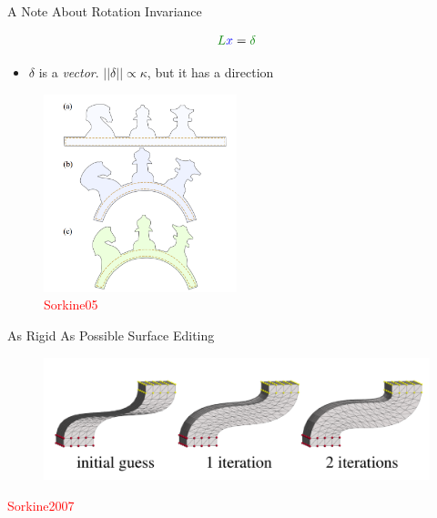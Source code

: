\documentclass{beamer}
\begin{document}
\begin{frame}{A Note About Rotation Invariance}

\[ \textcolor{darkgreen}{L} \textcolor{blue}{x} = \textcolor{darkgreen}{\delta} \]

\begin{itemize}[label=$\vartriangleright$]
\item $\delta$ is a {\em vector}.  $||\delta|| \propto \kappa$, but it has a direction
\end{itemize}

\begin{figure}[t]
    \includegraphics[width=0.5\textwidth]{Sorkine05.png}
    \caption{\textcolor{red}{Sorkine05}}
\end{figure}

\end{frame}

\begin{frame}{As Rigid As Possible Surface Editing}

\begin{figure}[t]
    \includegraphics[width=\textwidth]{Sorkine07_1.png}
\end{figure}


\textcolor{red}{Sorkine2007}

\end{frame}
\end{document}
